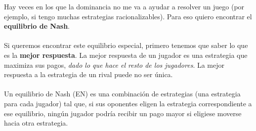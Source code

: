 \documentclass{article}
\begin{document}
                Hay veces en los que la dominancia no me va a ayudar a resolver un juego (por ejemplo, si tengo muchas estrategias racionalizables). Para eso quiero encontrar el \textbf{equilibrio de Nash}. \\
                \\
                Si queremos encontrar este equilibrio especial, primero tenemos que saber lo que es la \textbf{mejor respuesta}. La mejor respuesta de un jugador es una estrategia que maximiza sus pagos, \emph{dado lo que hace el resto de los jugadores}. La mejor respuesta a la estrategia de un rival puede no ser única. \\
                \\
                Un equilibrio de Nash (EN) es una combinación de estrategias (una estrategia para cada jugador) tal que, si sus oponentes eligen la estrategia correspondiente a ese equilibrio, ningún jugador podría recibir un pago mayor si eligiese moverse hacia otra estrategia.
\end{document}
